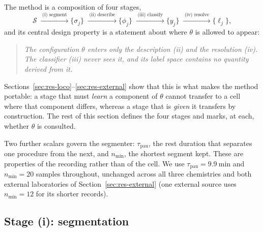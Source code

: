 \documentclass[preprint,3p,number]{elsarticle}
\begin{document}
The method is a composition of four stages,
\begin{equation}
\mathcal{S} \;\xrightarrow{\;\text{(i) segment}\;} \{\sigma_j\}
  \;\xrightarrow{\;\text{(ii) describe}\;} \{\phi_j\}
  \;\xrightarrow{\;\text{(iii) classify}\;} \{y_j\}
  \;\xrightarrow{\;\text{(iv) resolve}\;} \{\ell_j\},
\label{eq:pipeline}
\end{equation}
and its central design property is a statement about where $\theta$ is allowed
to appear:

\begin{quote}
\emph{The configuration $\theta$ enters only the description (ii) and the
resolution (iv). The classifier (iii) never sees it, and its label space
contains no quantity derived from it.}
\end{quote}

Sections~\ref{sec:res-loco}--\ref{sec:res-external} show that this is what makes
the method portable: a stage that must \emph{learn} a component of $\theta$
cannot transfer to a cell where that component differs, whereas a stage that is
\emph{given} it transfers by construction. The rest of this section defines the
four stages and marks, at each, whether $\theta$ is consulted.

Two further scalars govern the segmenter: $\tau_{\mathrm{pau}}$, the rest
duration that separates one procedure from the next, and $n_{\min}$, the
shortest segment kept. These are properties of the recording rather than of the
cell. We use $\tau_{\mathrm{pau}} = \SI{9.9}{\minute}$ and $n_{\min} = 20$
samples throughout, unchanged across all three chemistries and both external
laboratories of Section~\ref{sec:res-external} (one external source uses
$n_{\min} = 12$ for its shorter records).

\subsection{Stage (i): segmentation}
\label{sec:segmentation}
\end{document}
